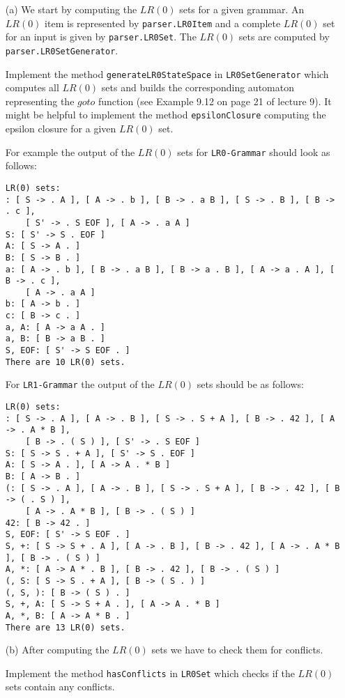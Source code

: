 \documentclass[a4paper]{article}
\begin{document}
\begin{exercise}{20}
\begin{itemize}
  \item[(a)] We start by computing the $LR(0)$ sets for a given grammar. An $LR(0)$ item is represented by \texttt{parser.LR0Item} and a complete $LR(0)$ set for an input is given by \texttt{parser.LR0Set}. The $LR(0)$ sets are computed by \texttt{parser.LR0SetGenerator}.

    Implement the method \texttt{generateLR0StateSpace} in \texttt{LR0SetGenerator} which computes all $LR(0)$ sets and builds the corresponding automaton representing the $goto$ function (see Example 9.12 on page 21 of lecture 9). It might be helpful to implement the method \texttt{epsilonClosure} computing the epsilon closure for a given $LR(0)$ set.

    For example the output of the $LR(0)$ sets for \texttt{LR0-Grammar} should look as follows:
    \begin{verbatim}
LR(0) sets:
: [ S -> . A ], [ A -> . b ], [ B -> . a B ], [ S -> . B ], [ B -> . c ],
    [ S' -> . S EOF ], [ A -> . a A ]
S: [ S' -> S . EOF ]
A: [ S -> A . ]
B: [ S -> B . ]
a: [ A -> . b ], [ B -> . a B ], [ B -> a . B ], [ A -> a . A ], [ B -> . c ],
    [ A -> . a A ]
b: [ A -> b . ]
c: [ B -> c . ]
a, A: [ A -> a A . ]
a, B: [ B -> a B . ]
S, EOF: [ S' -> S EOF . ]
There are 10 LR(0) sets.
    \end{verbatim}
    
        For \texttt{LR1-Grammar} the output of the $LR(0)$ sets should be as follows:
    \begin{verbatim}
LR(0) sets:
: [ S -> . A ], [ A -> . B ], [ S -> . S + A ], [ B -> . 42 ], [ A -> . A * B ],
    [ B -> . ( S ) ], [ S' -> . S EOF ]
S: [ S -> S . + A ], [ S' -> S . EOF ]
A: [ S -> A . ], [ A -> A . * B ]
B: [ A -> B . ]
(: [ S -> . A ], [ A -> . B ], [ S -> . S + A ], [ B -> . 42 ], [ B -> ( . S ) ],
    [ A -> . A * B ], [ B -> . ( S ) ]
42: [ B -> 42 . ]
S, EOF: [ S' -> S EOF . ]
S, +: [ S -> S + . A ], [ A -> . B ], [ B -> . 42 ], [ A -> . A * B ], [ B -> . ( S ) ]
A, *: [ A -> A * . B ], [ B -> . 42 ], [ B -> . ( S ) ]
(, S: [ S -> S . + A ], [ B -> ( S . ) ]
(, S, ): [ B -> ( S ) . ]
S, +, A: [ S -> S + A . ], [ A -> A . * B ]
A, *, B: [ A -> A * B . ]
There are 13 LR(0) sets.
    \end{verbatim}

  \item[(b)] After computing the $LR(0)$ sets we have to check them for conflicts.

    Implement the method \texttt{hasConflicts} in \texttt{LR0Set} which checks if the $LR(0)$ sets contain any conflicts.


\end{itemize}
\end{exercise}
\end{document}
